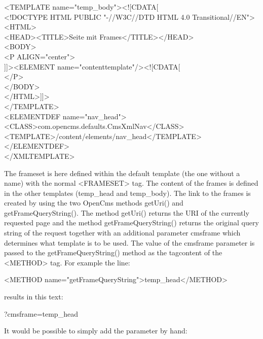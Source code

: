 \begin{xml}
<TEMPLATE name="temp\_body"><![CDATA[\\
\xtaba <!DOCTYPE HTML PUBLIC "-//W3C//DTD HTML 4.0 Transitional//EN">\\
\xtaba <HTML>\\
\xtaba   <HEAD><TITLE>Seite mit Frames</TITLE></HEAD>\\
\xtaba   <BODY>\\
\xtabb     <P ALIGN="center">\\
\xtabb       ]]><ELEMENT name="contenttemplate"/><![CDATA[\\
\xtabb     </P>\\
\xtaba   </BODY>\\
\xtaba </HTML>]]>\\
</TEMPLATE>\\

<ELEMENTDEF name="nav\_head">\\
\xtaba <CLASS>com.opencms.defaults.CmsXmlNav</CLASS>\\
\xtaba <TEMPLATE>/content/elements/nav\_head</TEMPLATE> \\
</ELEMENTDEF>\\

</XMLTEMPLATE>\\
\end{xml}


The frameset is here defined within the default template (the one
without a name) with the normal {\tag <FRAMESET>} tag. The content
of the frames is defined in the other templates (temp\_head and temp\_body).
The link to the frames is created by using the two OpenCms methods
{\meth getUri()} and {\meth getFrameQueryString()}. The method
{\meth getUri()} returns the URI of the currently requested page
and the method {\meth getFrameQueryString()} returns the original query string
of the request together with an additional parameter {\name cmsframe}
which determines what template is to be used. The value of the
cmsframe parameter is passed to the {\meth getFrameQueryString()} method
as the tagcontent of the {\tag <METHOD>} tag. For example the 
line:

\begin{xml}
<METHOD name="getFrameQueryString">temp\_head</METHOD>\\
\end{xml}

results in this text:
\begin{xml}
?cmsframe=temp\_head
\end{xml}

It would be possible to simply add the parameter by hand:


